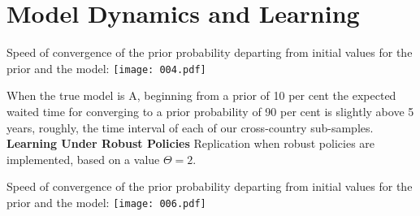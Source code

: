 \documentclass{beamer}
\begin{document}
\section{Model Dynamics and Learning}
\begin{frame} 
Speed of convergence of the prior probability departing from initial values for the prior and the model:
\texttt{[image: 004.pdf]}
\end{frame}

\begin{frame} 
When the true model is A, beginning from a prior of 10 per cent the
expected waited time for converging to a prior probability of 90 per cent is slightly above
5 years, roughly, the time interval of each of our cross-country sub-samples. 
\newline
\textbf{Learning Under Robust Policies} Replication when robust policies are
implemented, based on a value $\Theta = 2$.
\end{frame} 

\begin{frame} 
Speed of convergence of the prior probability departing from initial values for the prior and the model:
\texttt{[image: 006.pdf]}
\end{frame}
\end{document}

